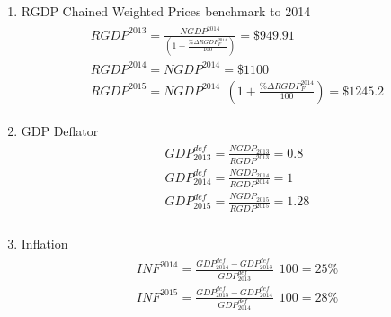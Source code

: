 \documentclass[letterpaper,12pt]{article}
\theoremstyle{dotlessS}
\begin{document}
\begin{enumerate}
\begin{eqnarray*}
\begin{array}{l}
NGDP_{2014}=\$5.00 \: \: 120+\$2.50 \: \: 200=\$1100  \\[1.2ex]
NGDP_{2015}=\$6.00 \: \: 150+\$3.50 \: \: 200=\$1600  \\[1.2ex]
\end{array}
\end{eqnarray*}
\item RGDP Chained Weighted Prices benchmark to 2014
\begin{eqnarray*}
\begin{array}{l}
RGDP^{2013}=\frac{NGDP^{2014}}{\left(1+\frac{\% \Delta RGDP_F^{2014}}{100}\right)}=\$949.91  \\[4ex]
RGDP^{2014}=NGDP^{2014}=\$1100  \\[1.2ex]
RGDP^{2015}=NGDP^{2014} \: \: \left(1+\frac{\% \Delta RGDP_F^{2014}}{100} \right)=\$1245.2
\end{array}
\end{eqnarray*}
\item GDP Deflator
\begin{eqnarray*}
\begin{array}{l}
GDP^{def}_{2013}=\frac{NGDP_{2013}}{RGDP^{2013}}=0.8 \\[1.2ex]
GDP^{def}_{2014}=\frac{NGDP_{2014}}{RGDP^{2014}}=1 \\[1.2ex]
GDP^{def}_{2015}=\frac{NGDP_{2015}}{RGDP^{2015}}=1.28 \\[1.2ex]
\end{array}
\end{eqnarray*}
\item Inflation
\begin{eqnarray*}
\begin{array}{l}
INF^{2014}=\frac{GDP^{def}_{2014}-GDP^{def}_{2013}}{GDP^{def}_{2013}} \: \: 100 =25\%  \\[1.2ex]
INF^{2015}=\frac{GDP^{def}_{2015}-GDP^{def}_{2014}}{GDP^{def}_{2014}} \: \: 100 =28\% 
\end{array}
\end{eqnarray*}
\end{enumerate}
\end{document}
